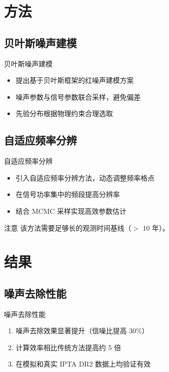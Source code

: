 \documentclass[aspectratio=169]{beamer}
\begin{document}
\section{方法}

\subsection{贝叶斯噪声建模}
\begin{frame}{贝叶斯噪声建模}
  \begin{itemize}
    \item 提出基于贝叶斯框架的红噪声建模方案
    \item 噪声参数与信号参数联合采样，避免偏差
    \item 先验分布根据物理约束合理选取
  \end{itemize}
\end{frame}

\subsection{自适应频率分辨}
\begin{frame}{自适应频率分辨}
  \begin{itemize}
    \item 引入自适应频率分辨方法，动态调整频率格点
    \item 在信号功率集中的频段提高分辨率
    \item 结合 MCMC 采样实现高效参数估计
  \end{itemize}

  \begin{alertblock}{注意}
    该方法需要足够长的观测时间基线（$>$ 10 年）。
  \end{alertblock}
\end{frame}

\section{结果}

\subsection{噪声去除性能}
\begin{frame}{噪声去除性能}
  \begin{enumerate}
    \item 噪声去除效果显著提升（信噪比提高 30\%）
    \item 计算效率相比传统方法提高约 5 倍
    \item 在模拟和真实 IPTA DR2 数据上均验证有效
  \end{enumerate}
\end{frame}
\end{document}
